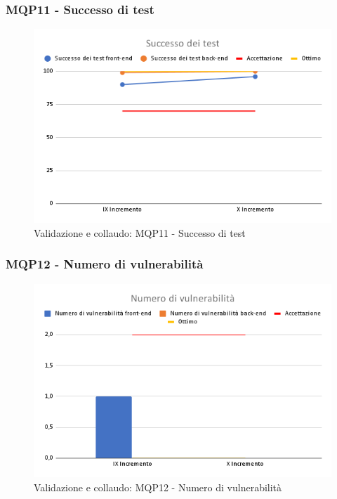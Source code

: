 \subsubsection{MQP11 - Successo di test}
\begin{figure}[H]
    \centering
    \includegraphics[scale=0.50]{Sezioni/images/last_prodotto/Successo_dei_test.png}
    \caption{Validazione e collaudo: MQP11 - Successo di test}
\end{figure}
\subsubsection{MQP12 - Numero di vulnerabilità}
\begin{figure}[H]
    \centering
    \includegraphics[scale=0.50]{Sezioni/images/last_prodotto/Numero_di_vulnerabilita.png}
    \caption{Validazione e collaudo: MQP12 - Numero di vulnerabilità}
\end{figure}

